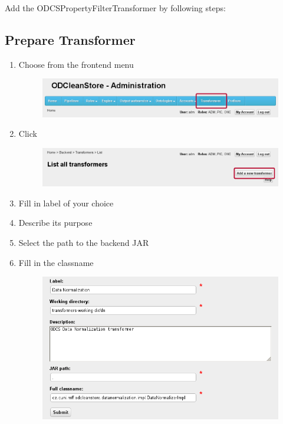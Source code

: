 Add the ODCSPropertyFilterTransformer by following steps:

\subsection*{Prepare Transformer}
\label{sec:prepareTransformer}
\begin{enumerate}
	\item Choose  from the frontend menu

\begin{figure}[!h]
    \centering
    \includegraphics[width=\textwidth]{images/fe-walkthrough-menu-transformers.png}
	\label{fig:feWTMenuTransformers}
\end{figure}

	\item Click 

\begin{figure}[!h]
    \centering
    \includegraphics[width=\textwidth]{images/fe-walkthrough-add-transformer.png}
	\label{fig:feWTAddTransformer}
\end{figure}

	\item Fill in label of your choice
	
	\item Describe its purpose
	
	\item Select the path to the backend JAR
	
	\item Fill in the classname
	
\begin{figure}[!h]
    \centering
    \includegraphics[width=\textwidth]{images/fe-walkthrough-new-transformer.png}
	\label{fig:feWTNewTransformers}
\end{figure}

\end{enumerate}

